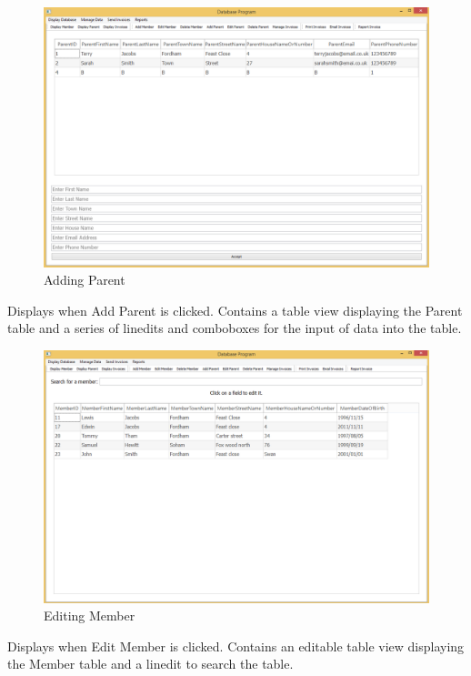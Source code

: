\begin{figure}[H]
\includegraphics[width=\textwidth]{./Maintenance/Images/AddParent.png}
    \caption{Adding Parent} \label{fig:add_parent}
\end{figure}

Displays when Add Parent is clicked. Contains a table view displaying the Parent table and a series of linedits and comboboxes for the input of data into the table.

\begin{figure}[H]
\includegraphics[width=\textwidth]{./Maintenance/Images/EditMember.png}
    \caption{Editing Member} \label{fig:edit_member}
\end{figure}

Displays when Edit Member is clicked. Contains an editable table view displaying the Member table and a linedit to search the table.

